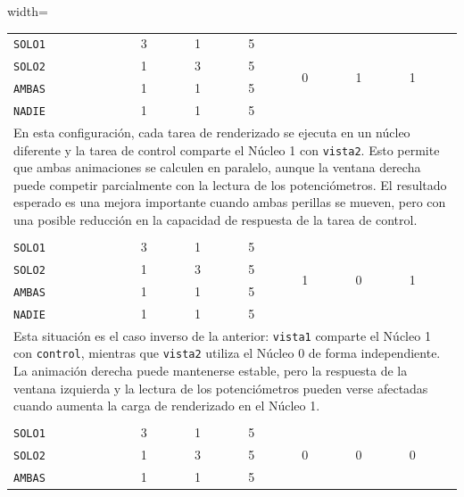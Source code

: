 \documentclass[12pt, letterpaper]{article}
\begin{document}
\begin{table}[H]
\begin{adjustbox}{width=\textwidth}
\begin{tabular}{|l|l|l|l|l|l|l|}
        \hline
        \rowcolor{NavyBlue!80}
        \multicolumn{7}{|c|}{\textbf{Situación 2}} \\
        \hline
        \texttt{SOLO1} & 3 & 1 & 5 & \multirow{4}{*}{0} & \multirow{4}{*}{1} & \multirow{4}{*}{1} \\
        \texttt{SOLO2} & 1 & 3 & 5 &  &  &  \\
        \texttt{AMBAS} & 1 & 1 & 5 &  &  &  \\
        \texttt{NADIE} & 1 & 1 & 5 &  &  &  \\
        \hline
        \multicolumn{7}{|p{\textwidth}|}{
            En esta configuración, cada tarea de renderizado se ejecuta en un núcleo diferente y la tarea de control comparte el Núcleo 1 con \texttt{vista2}. Esto permite que ambas animaciones se calculen en paralelo, aunque la ventana derecha puede competir parcialmente con la lectura de los potenciómetros. El resultado esperado es una mejora importante cuando ambas perillas se mueven, pero con una posible reducción en la capacidad de respuesta de la tarea de control.
        } \\
        \hline
        \rowcolor{NavyBlue!80}
        \multicolumn{7}{|c|}{\textbf{Situación 3}} \\
        \hline
        \texttt{SOLO1} & 3 & 1 & 5 & \multirow{4}{*}{1} & \multirow{4}{*}{0} & \multirow{4}{*}{1} \\
        \texttt{SOLO2} & 1 & 3 & 5 &  &  &  \\
        \texttt{AMBAS} & 1 & 1 & 5 &  &  &  \\
        \texttt{NADIE} & 1 & 1 & 5 &  &  &  \\
        \hline
        \multicolumn{7}{|p{\textwidth}|}{
            Esta situación es el caso inverso de la anterior: \texttt{vista1} comparte el Núcleo 1 con \texttt{control}, mientras que \texttt{vista2} utiliza el Núcleo 0 de forma independiente. La animación derecha puede mantenerse estable, pero la respuesta de la ventana izquierda y la lectura de los potenciómetros pueden verse afectadas cuando aumenta la carga de renderizado en el Núcleo 1.
        } \\
        \hline
        \rowcolor{NavyBlue!80}
        \multicolumn{7}{|c|}{\textbf{Situación 4}} \\
        \hline
        \texttt{SOLO1} & 3 & 1 & 5 & \multirow{4}{*}{0} & \multirow{4}{*}{0} & \multirow{4}{*}{0} \\
        \texttt{SOLO2} & 1 & 3 & 5 &  &  &  \\
        \texttt{AMBAS} & 1 & 1 & 5 &  &  &  \\

\end{tabular}
\end{adjustbox}
\end{table}
\end{document}
